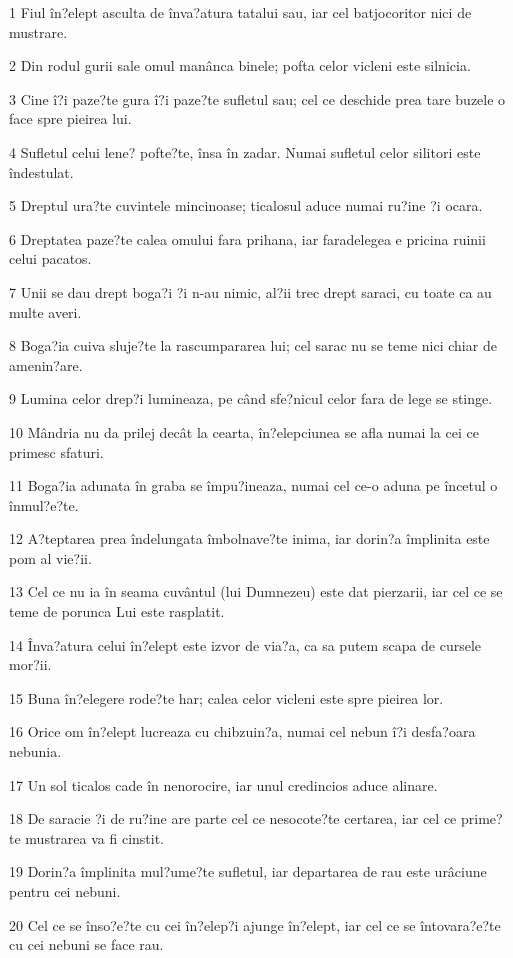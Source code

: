 \par 1 Fiul în?elept asculta de înva?atura tatalui sau, iar cel batjocoritor nici de mustrare.
\par 2 Din rodul gurii sale omul manânca binele; pofta celor vicleni este silnicia.
\par 3 Cine î?i paze?te gura î?i paze?te sufletul sau; cel ce deschide prea tare buzele o face spre pieirea lui.
\par 4 Sufletul celui lene? pofte?te, însa în zadar. Numai sufletul celor silitori este îndestulat.
\par 5 Dreptul ura?te cuvintele mincinoase; ticalosul aduce numai ru?ine ?i ocara.
\par 6 Dreptatea paze?te calea omului fara prihana, iar faradelegea e pricina ruinii celui pacatos.
\par 7 Unii se dau drept boga?i ?i n-au nimic, al?ii trec drept saraci, cu toate ca au multe averi.
\par 8 Boga?ia cuiva sluje?te la rascumpararea lui; cel sarac nu se teme nici chiar de amenin?are.
\par 9 Lumina celor drep?i lumineaza, pe când sfe?nicul celor fara de lege se stinge.
\par 10 Mândria nu da prilej decât la cearta, în?elepciunea se afla numai la cei ce primesc sfaturi.
\par 11 Boga?ia adunata în graba se împu?ineaza, numai cel ce-o aduna pe încetul o înmul?e?te.
\par 12 A?teptarea prea îndelungata îmbolnave?te inima, iar dorin?a împlinita este pom al vie?ii.
\par 13 Cel ce nu ia în seama cuvântul (lui Dumnezeu) este dat pierzarii, iar cel ce se teme de porunca Lui este rasplatit.
\par 14 Înva?atura celui în?elept este izvor de via?a, ca sa putem scapa de cursele mor?ii.
\par 15 Buna în?elegere rode?te har; calea celor vicleni este spre pieirea lor.
\par 16 Orice om în?elept lucreaza cu chibzuin?a, numai cel nebun î?i desfa?oara nebunia.
\par 17 Un sol ticalos cade în nenorocire, iar unul credincios aduce alinare.
\par 18 De saracie ?i de ru?ine are parte cel ce nesocote?te certarea, iar cel ce prime?te mustrarea va fi cinstit.
\par 19 Dorin?a împlinita mul?ume?te sufletul, iar departarea de rau este urâciune pentru cei nebuni.
\par 20 Cel ce se înso?e?te cu cei în?elep?i ajunge în?elept, iar cel ce se întovara?e?te cu cei nebuni se face rau.
